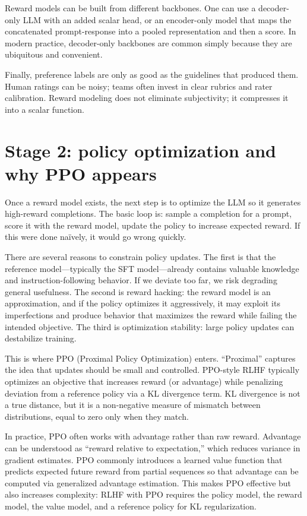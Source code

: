 Reward models can be built from different backbones. One can use a decoder-only LLM with an added scalar head, or an encoder-only model that maps the concatenated prompt-response into a pooled representation and then a score. In modern practice, decoder-only backbones are common simply because they are ubiquitous and convenient.

Finally, preference labels are only as good as the guidelines that produced them. Human ratings can be noisy; teams often invest in clear rubrics and rater calibration. Reward modeling does not eliminate subjectivity; it compresses it into a scalar function.

\section{Stage 2: policy optimization and why PPO appears}
Once a reward model exists, the next step is to optimize the LLM so it generates high-reward completions. The basic loop is: sample a completion for a prompt, score it with the reward model, update the policy to increase expected reward. If this were done naïvely, it would go wrong quickly.

There are several reasons to constrain policy updates. The first is that the reference model—typically the SFT model—already contains valuable knowledge and instruction-following behavior. If we deviate too far, we risk degrading general usefulness. The second is reward hacking: the reward model is an approximation, and if the policy optimizes it aggressively, it may exploit its imperfections and produce behavior that maximizes the reward while failing the intended objective. The third is optimization stability: large policy updates can destabilize training.

This is where PPO (Proximal Policy Optimization) enters. “Proximal” captures the idea that updates should be small and controlled. PPO-style RLHF typically optimizes an objective that increases reward (or advantage) while penalizing deviation from a reference policy via a KL divergence term. KL divergence is not a true distance, but it is a non-negative measure of mismatch between distributions, equal to zero only when they match.

In practice, PPO often works with advantage rather than raw reward. Advantage can be understood as “reward relative to expectation,” which reduces variance in gradient estimates. PPO commonly introduces a learned value function that predicts expected future reward from partial sequences so that advantage can be computed via generalized advantage estimation. This makes PPO effective but also increases complexity: RLHF with PPO requires the policy model, the reward model, the value model, and a reference policy for KL regularization.

